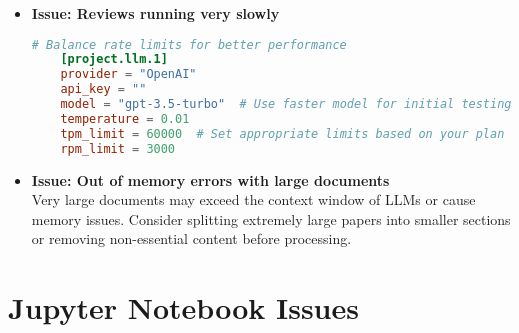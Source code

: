 \begin{itemize}
    \item \textbf{Issue: Reviews running very slowly}

    \begin{configbox}
    \begin{lstlisting}[language=TOML]
    # Balance rate limits for better performance
    [project.llm.1]
    provider = "OpenAI"
    api_key = ""
    model = "gpt-3.5-turbo"  # Use faster model for initial testing
    temperature = 0.01
    tpm_limit = 60000  # Set appropriate limits based on your plan
    rpm_limit = 3000
    \end{lstlisting}
    \end{configbox}

    \item \textbf{Issue: Out of memory errors with large documents}
    \\
    Very large documents may exceed the context window of LLMs or cause memory issues. Consider splitting extremely large papers into smaller sections or removing non-essential content before processing.
\end{itemize}

\section{Jupyter Notebook Issues}

